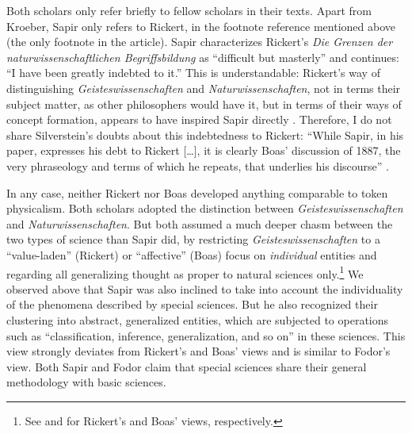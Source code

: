 \documentclass[output=paper]{langscibook}
\begin{document}
Both scholars only refer briefly to fellow scholars in their texts. Apart from Kroeber, Sapir only refers to Rickert, in the footnote reference mentioned above (the only footnote in the article). Sapir characterizes Rickert's \emph{Die Grenzen der naturwissenschaftlichen Begriffsbildung} as ``difficult but masterly'' and continues: ``I have been greatly indebted to it.'' This is understandable: Rickert's way of distinguishing \emph{Geisteswissenschaften} and \emph{Naturwissenschaften}, not in terms their subject matter, as other philosophers would have it, but in terms of their ways of concept formation, appears to have inspired Sapir directly \citep[cf.][]{Anchor1967}.  Therefore, I do not share Silverstein's doubts about this indebtedness to Rickert: ``While Sapir, in his paper, expresses his debt to Rickert […], it is clearly Boas' discussion of 1887, the very phraseology and terms of which he repeats, that underlies his discourse'' \citep[70, fn.5]{Silverstein1986}.\label{q:elffers:silversteinref}

In any case, neither Rickert nor Boas developed anything comparable to token physicalism. Both scholars adopted the distinction between \emph{Geisteswissenschaften} and \emph{Naturwissenschaften}. But both assumed a much deeper chasm between the two types of science than Sapir did, by restricting \emph{Geisteswissenschaften} to a ``value-laden'' (Rickert) or ``affective'' (Boas) focus on \emph{individual} entities and regarding all generalizing thought as proper to natural sciences only.\footnote{See \citet{Anchor1967}  and \citet{Silverstein1986} for Rickert's and Boas' views, respectively.} We observed above that Sapir was also inclined to take into account the individuality of the phenomena described by special sciences. But he also recognized their clustering into abstract, generalized entities, which are subjected to operations such as ``classification, inference, generalization, and so on'' in these sciences. This view strongly deviates from Rickert's and Boas' views and is similar to Fodor's view. Both Sapir and Fodor claim that special sciences share their general methodology with basic sciences.
\end{document}
